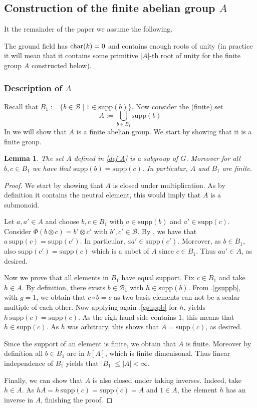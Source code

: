 \documentclass[a4paper,10pt]{amsart}
\newtheorem{lemma}{Lemma}[section]
\theoremstyle{definition}
\theoremstyle{remark}
\newcommand{\Supp}{\mathrm{supp}}
\newcommand\Char{{\rm char}}
\newcommand\ot{\otimes}
\newcommand\mc{\mathcal}
\begin{document}
\subsection{Construction of the finite abelian group $A$}\label{subsectie A}
It the remainder of the paper we assume the following.\smallskip

 The ground field has $\Char(k) = 0$ and contains enough roots of unity (in practice it will mean that it contains some primitive $|A|$-th root of unity for the finite group $A$ constructed below).

\subsubsection{Description of $A$}
Recall that $B_1:=\{b\in \mc{B} \mid 1\in\Supp(b)\}$. Now consider the (finite) set
\begin{equation}\label{def A}
A:=\bigcup_{b\in B_1}\Supp(b)
\end{equation}
In  we will show that $A$ is a finite abelian group. We start by showing that it is a finite group.

\begin{lemma}\label{A is subgroup}
    The set $A$ defined in \eqref{def A} is a subgroup of $G$. Moreover for all $b,c \in B_1$ we have that $\Supp(b) = \Supp(c)$. In particular, $A$ and $B_1$ are finite.
\end{lemma}
\begin{proof}
We start by showing that $A$ is closed under multiplication. As by definition it contains the neutral element, this would imply that $A$ is a submonoid.

Let $a,a'\in A$ and choose $b,c\in B_1$ with $a\in\Supp(b)$ and $a'\in\Supp(c)$.
Consider $\Phi(b\ot c)=b'\ot c'$ with $b',c'\in \mc{B}$.
By , we have that $ a\,\Supp(c)=\Supp(c')$. In particular, $aa'\in \Supp(c')$. Moreover, as $b \in B_1$, also $\Supp(c')= \Supp(c)$ which is a subet of $A$ since $c \in B_1.$ Thus $aa' \in A$, as desired. \smallskip

Now we prove that all elements in $B_1$ have equal support. 
Fix $c\in B_1$ and take $h \in A$. By definition, there exists $b\in \mc B_1$ with $h\in \Supp(b)$. From .\eqref{gsuppb}, with $g=1$, we obtain that $c\circ b=c$ as two basis elements can not be a scalar multiple of each other. Now applying again .\eqref{gsuppb} for $h$, yields $h\, \Supp(c) = \Supp(c).$ As the righ hand side contains $1$, this means that $h \in \Supp(c)$. As $h$ was arbitrary, this shows that $A = \Supp(c)$, as desired.\smallskip

Since the support of an element is finite, we obtain that $A$ is finite. Moreover by definition all $b \in B_1$ are in $k[A]$, which is finite dimenisonal. Thus linear independence of $B_1$ yields that $|B_1| \leq |A| < \infty.$\smallskip

Finally, we can show that $A$ is also closed under taking inverses. Indeed, take $h \in A$. As $hA = h\, \Supp(c)  = \Supp(c) = A$ and $1 \in A$, the element $h$ has an inverse in $A$, finishing the proof.
\end{proof}
\end{document}

